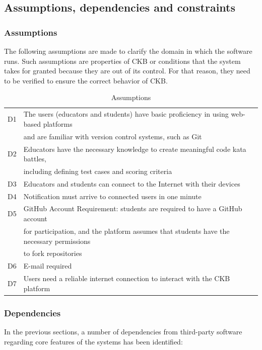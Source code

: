 \subsection {Assumptions, dependencies and constraints}

\subsubsection{Assumptions}
The following assumptions are made to clarify the domain in which the software runs. Such assumptions are properties of CKB or conditions that the system takes for granted because they are out of its control. For that reason, they need to be verified to ensure the correct behavior of CKB.

\begin{table}[h]
    \centering
    \begin{tabular}{|l|l|}
    \hline
        D1 & The users (educators and students) have basic proficiency in using web-based platforms \\
        & and are familiar with version control systems, such as Git\\
    \hline
        D2 & Educators have the necessary knowledge to create meaningful code kata battles,\\ 
        & including defining test cases and scoring criteria \\
    \hline
        D3 & Educators and students can connect to the Internet with their devices \\
    \hline
        D4 & Notification must arrive to connected users in one minute \\
    \hline
        D5 & GitHub Account Requirement: students are required to have a GitHub account \\
        & for participation, and the platform assumes that students have the necessary permissions 
        \\ & to fork repositories \\
    \hline
        D6 & E-mail required \\
    \hline
        D7 & Users need a reliable internet connection to interact with the CKB platform\\
    \hline
    \end{tabular}
    \caption{Assumptions}
    \label{tab:assumptions}
\end{table}


\subsubsection{Dependencies}
In the previous sections, a number of dependencies from third-party software regarding core features of the systems has been identified:

